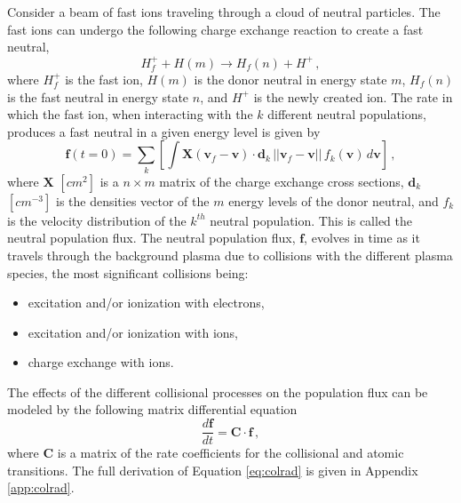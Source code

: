 Consider a beam of fast ions traveling through a cloud of neutral particles. The fast ions can undergo the following charge exchange reaction to create a fast neutral,
\begin{equation}
    H_f^+ + H(m) \rightarrow H_f(n) + H^+\,,
\end{equation}
where $H_f^+$ is the fast ion, $H(m)$ is the donor neutral in energy state $m$, $H_f(n)$ is the fast neutral in energy state $n$, and $H^+$ is the newly created ion.
The rate in which the fast ion, when interacting with the $k$ different neutral populations, produces a fast neutral in a given energy level is given by
\begin{equation}\label{eq:cx_rates}
    \mathbf{f}(t=0) = \sum_k \left [ \int \mathbf{X}(\mathbf{v}_f - \mathbf{v}) \cdot \mathbf{d}_k\, ||\mathbf{v}_f - \mathbf{v}||\, f_k(\mathbf{v})\, d\mathbf{v} \right ]\,,
\end{equation}
where $\mathbf{X}$ $[cm^2]$ is a $n \times m$ matrix of the charge exchange cross sections, $\mathbf{d}_k$ $[cm^{-3}]$ is the densities vector of the $m$ energy levels of the donor neutral, and $f_k$ is the velocity distribution of the $k^{th}$ neutral population. This is called the neutral population flux.
The neutral population flux, $\mathbf{f}$, evolves in time as it travels through the background plasma due to collisions with the different plasma species, the most significant collisions being:
\begin{itemize}
    \item excitation and/or ionization with electrons,
    \item excitation and/or ionization with ions,
    \item charge exchange with ions.
\end{itemize}

The effects of the different collisional processes on the population flux can be modeled by the following matrix differential equation 
\begin{equation}\label{eq:colrad}
    \frac{d \mathbf{f}}{dt} = \mathbf{C} \cdot \mathbf{f}\,,
\end{equation}
where $\mathbf{C}$ is a matrix of the rate coefficients for the collisional and atomic transitions.
The full derivation of Equation \ref{eq:colrad} is given in Appendix \ref{app:colrad}.

